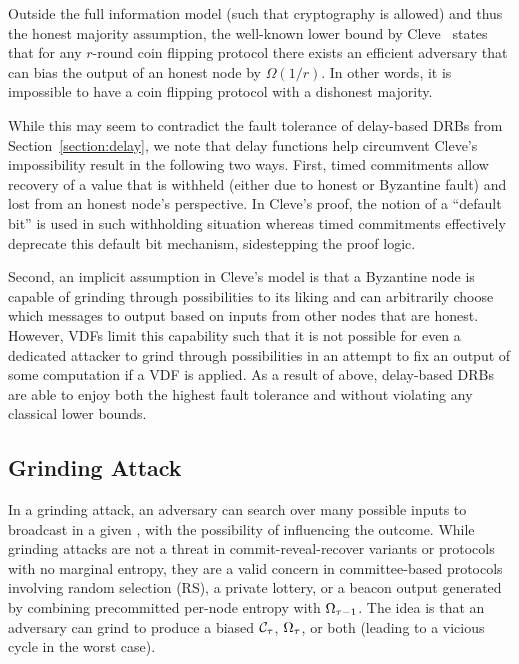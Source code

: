 Outside the full information model (such that cryptography is allowed) and thus the honest majority assumption, the well-known lower bound by Cleve~\cite{cleve1986limits} states that for any $r$-round coin flipping protocol there exists an efficient adversary that can bias the output of an honest node by $\Omega(1 / r)$.
In other words, it is impossible to have a \drbsecure coin flipping protocol with a dishonest majority.

While this may seem to contradict the fault tolerance of delay-based DRBs from Section~\ref{section:delay}, we note that delay functions help circumvent Cleve's impossibility result in the following two ways.
First, timed commitments allow recovery of a value that is withheld (either due to honest or Byzantine fault) and lost from an honest node's perspective.
In Cleve's proof, the notion of a ``default bit'' is used in such withholding situation whereas timed commitments effectively deprecate this default bit mechanism, sidestepping the proof logic.

Second, an implicit assumption in Cleve's model is that a Byzantine node is capable of grinding through possibilities to its liking and can arbitrarily choose which messages to output based on inputs from other nodes that are honest.
However, VDFs limit this capability such that it is not possible for even a dedicated attacker to grind through possibilities in an attempt to fix an output of some computation if a VDF is applied.
As a result of above, delay-based DRBs are able to enjoy both the highest fault tolerance and \drbsecurity without violating any classical lower bounds.

\subsection{Grinding Attack}
In a grinding attack, an adversary can search over many possible inputs to broadcast in a given \epoch, with the possibility of influencing the outcome. While grinding attacks are not a threat in commit-reveal-recover variants or protocols with no marginal entropy, they are a valid concern in committee-based protocols involving random selection (RS), a private lottery, or a beacon output generated by combining precommitted per-node entropy with $\Omega_{\tau - 1}$. The idea is that an adversary can grind to produce a biased $\mathcal{C}_\tau$, $\Omega_\tau$, or both (leading to a vicious cycle in the worst case).

